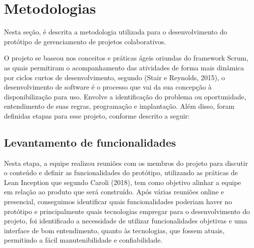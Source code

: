 \section{Metodologias}
Nesta seção, é descrita a metodologia utilizada para o desenvolvimento do  protótipo de gerenciamento de projetos colaborativos.

O projeto se baseou nos conceitos e práticas ágeis oriundas do framework Scrum, as quais permitiram o acompanhamento das atividades de forma mais dinâmica por ciclos curtos de desenvolvimento, segundo (Stair e Reynolds, 2015), o desenvolvimento de software é o processo que vai da sua concepção à disponibilização para uso. Envolve a identificação do problema ou oportunidade, entendimento de suas regras, programação e implantação. Além disso, foram definidas etapas para esse projeto, conforme descrito a seguir:

\subsection{Levantamento de funcionalidades}
Nesta etapa, a equipe realizou reuniões com os membros do projeto para discutir o conteúdo e definir as funcionalidades do protótipo, utilizando as práticas de Lean Inception que segundo Caroli (2018), tem como objetivo alinhar a equipe em relação ao produto que será construído.
Após várias reuniões online e presencial, conseguimos identificar quais funcionalidades poderiam haver no protótipo e principalmente quais tecnologias empregar para o desenvolvimento do projeto, foi identificado a necessidade de utilizar funcionalidades objetivas e uma interface de bom entendimento, quanto às tecnologias, que fossem atuais, permitindo a fácil manutenibilidade e confiabilidade.

